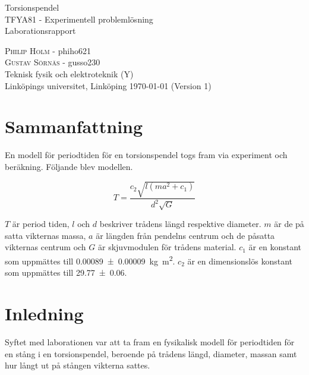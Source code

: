 \documentclass[a4paper,12pt]{article}
\begin{document}
\begin{titlepage}
  \centering
  \vspace{10cm}
  {\Huge Torsionspendel \\}
  \vspace{2cm}
  {\Large TFYA81 - Experimentell problemlösning \\}
  \vspace{0.8em}
  {\Large Laborationsrapport}
  \vfill

  {
    \textsc{Philip Holm} - phiho621 \\
    \textsc{Gustav Sörnäs} - gusso230 \\
    \vspace{2cm}
    Teknisk fysik och elektroteknik (Y) \\
    Linköpings universitet, Linköping \today{} (Version 1)
  }

\end{titlepage}

\section*{Sammanfattning}

En modell för periodtiden för en torsionspendel togs
fram via experiment och beräkning. Följande blev modellen.

\begin{equation*}
  T = \frac{c_2 \sqrt{l(ma^2 + c_1)}}{d^2 \sqrt{G}}
\end{equation*}

$T$ är period tiden, $l$ och $d$ beskriver trådens längd respektive diameter. $m$ är de
på satta vikternas massa, $a$ är längden från pendelns centrum och de påsatta
vikternas centrum och $G$ är skjuvmodulen för trådens material. $c_1$ är en konstant
som uppmättes till \SI{0.00089(9)}{\kilogram \meter \squared}. $c_2$ är en dimensionslös
konstant som uppmättes till \num{29.77(6)}.  %

\clearpage

\tableofcontents
\clearpage


\section{Inledning}

Syftet med laborationen var att ta fram en fysikalisk modell för periodtiden
för en stång i en torsionspendel,  beroende på trådens längd, diameter, massan
samt hur långt ut på stången vikterna sattes.
\end{document}
